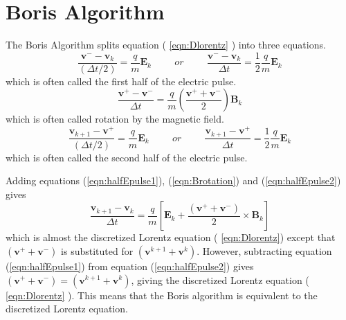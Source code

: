 \documentclass[12pt]{article}
\begin{document}
{		\section{Boris Algorithm}
		The Boris Algorithm splits equation ( \ref{eqn:Dlorentz} ) into three equations.
		\begin{equation}
			\label{eqn:halfEpulse1}
			\frac{\textbf{v}^{-} - \textbf{v}_{k}}{\left( \Delta t  / 2 \right)} = \frac{q}{m} \textbf{E}_{k} \hspace{1cm} or \hspace{1cm}	
			\frac{\textbf{v}^{-} - \textbf{v}_{k}}{ \Delta t } = \frac{1}{2}\frac{q}{m} \textbf{E}_{k}
		\end{equation}
		which is often called the first half of the electric pulse.
		\begin{equation}
			\label{eqn:Brotation}
			\frac{\textbf{v}^{+} - \textbf{v}^{-}}{ \Delta t } = \frac{q}{m} \left(\frac{\textbf{v}^{+} + \textbf{v}^{-}}{ 2 }\right) \textbf{B}_{k}
		\end{equation}
		which is often called rotation by the magnetic field.
		\begin{equation}
			\label{eqn:halfEpulse2}
			\frac{\textbf{v}_{k+1} - \textbf{v}^{+}}{\left( \Delta t  / 2 \right)} = \frac{q}{m} \textbf{E}_{k} \hspace{1cm} or \hspace{1cm}	
			\frac{\textbf{v}_{k+1} - \textbf{v}^{+}}{ \Delta t } = \frac{1}{2}\frac{q}{m} \textbf{E}_{k}
		\end{equation}
		which is often called the second half of the electric pulse.
		
		\noindent Adding equations (\ref{eqn:halfEpulse1}), (\ref{eqn:Brotation}) and (\ref{eqn:halfEpulse2}) gives
		$$ \label{eqn:Dlorentz}
		\frac{\textbf{v}_{k+1} - \textbf{v}_{k}}{\Delta t} = \frac{q}{m} \left[\textbf{E}_{k} + \frac{\left( \textbf{v}^{+} + \textbf{v}^{-} \right) }{2} \times \textbf{B}_{k} \right] $$ which is almost the discretized Lorentz equation ( \ref{eqn:Dlorentz}) except that $\left( \textbf{v}^{+} + \textbf{v}^{-} \right) $ is substituted for $\left( \textbf{v}^{k+1} + \textbf{v}^{k}\right) $. However, subtracting equation (\ref{eqn:halfEpulse1}) from equation (\ref{eqn:halfEpulse2}) gives $\left( \textbf{v}^{+} + \textbf{v}^{-} \right) = \left( \textbf{v}^{k+1} + \textbf{v}^{k}\right) $, giving the discretized Lorentz equation ( \ref{eqn:Dlorentz} ). This means that the Boris algorithm is equivalent to the discretized Lorentz equation. \\
		
}
\end{document}
